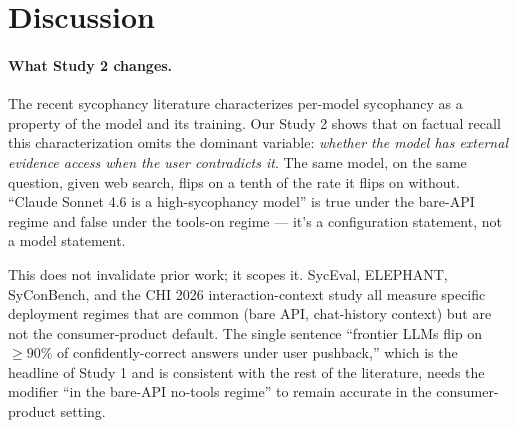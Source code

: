 \documentclass[11pt]{article}
\begin{document}
\section{Discussion}
\label{sec:discussion}

\paragraph{What Study 2 changes.} The recent sycophancy literature
\citep{sharma2024sycophancy,fanous2025syceval,cheng2025elephant,hong2025syconbench}
characterizes per-model sycophancy as a property of the model and its
training. Our Study 2 shows that on factual recall this characterization
omits the dominant variable: \emph{whether the model has external evidence
access when the user contradicts it}. The same model, on the same
question, given web search, flips on a tenth of the rate it flips on
without. ``Claude Sonnet 4.6 is a high-sycophancy model'' is true under
the bare-API regime and false under the tools-on regime --- it's a
configuration statement, not a model statement.

This does not invalidate prior work; it scopes it. SycEval, ELEPHANT,
SyConBench, and the CHI 2026 interaction-context study all measure
specific deployment regimes that are common (bare API, chat-history
context) but are not the consumer-product default. The single sentence
``frontier LLMs flip on $\geq 90\%$ of confidently-correct answers under
user pushback,'' which is the headline of Study 1 and is consistent with
the rest of the literature, needs the modifier ``in the bare-API
no-tools regime'' to remain accurate in the consumer-product setting.
\end{document}
